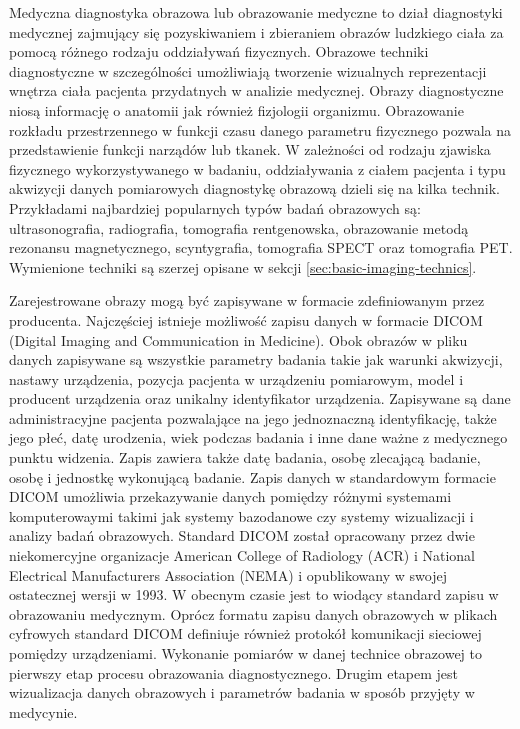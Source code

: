 Medyczna diagnostyka obrazowa lub obrazowanie medyczne to dział diagnostyki medycznej zajmujący się pozyskiwaniem i zbieraniem obrazów ludzkiego ciała za pomocą różnego rodzaju oddziaływań fizycznych.
Obrazowe techniki diagnostyczne w szczególności umożliwiają tworzenie wizualnych reprezentacji wnętrza ciała pacjenta przydatnych w analizie medycznej. Obrazy diagnostyczne niosą informację o anatomii jak również fizjologii organizmu.
Obrazowanie rozkładu przestrzennego w funkcji czasu danego parametru fizycznego pozwala na przedstawienie funkcji narządów lub tkanek.
W zależności od rodzaju zjawiska fizycznego wykorzystywanego w badaniu, oddziaływania z ciałem pacjenta i typu akwizycji danych pomiarowych diagnostykę obrazową dzieli się na kilka technik.
Przykładami najbardziej popularnych typów badań obrazowych są: ultrasonografia, radiografia, tomografia rentgenowska, obrazowanie metodą rezonansu magnetycznego, scyntygrafia, tomografia SPECT oraz tomografia PET.
Wymienione techniki są szerzej opisane w sekcji \ref{sec:basic-imaging-technics}.
\par
Zarejestrowane obrazy mogą być zapisywane w formacie zdefiniowanym przez producenta.
Najczęściej istnieje możliwość zapisu danych w formacie DICOM (Digital Imaging and Communication in Medicine). 
Obok obrazów w pliku danych zapisywane są wszystkie parametry badania takie jak warunki akwizycji, nastawy urządzenia, pozycja pacjenta w urządzeniu pomiarowym, model i producent urządzenia oraz unikalny identyfikator urządzenia.
Zapisywane są dane administracyjne pacjenta pozwalające na jego jednoznaczną identyfikację, także jego płeć, datę urodzenia, wiek podczas badania i inne dane ważne z medycznego punktu widzenia.
Zapis zawiera także datę badania, osobę zlecającą badanie, osobę i jednostkę wykonującą badanie.
Zapis danych w standardowym formacie DICOM umożliwia przekazywanie danych pomiędzy różnymi systemami komputerowaymi takimi jak systemy bazodanowe czy systemy wizualizacji i analizy badań obrazowych.
Standard DICOM został opracowany przez dwie niekomercyjne organizacje American College of Radiology (ACR) i National Electrical Manufacturers Association (NEMA) i opublikowany w swojej ostatecznej wersji w 1993.
W obecnym czasie jest to wiodący standard zapisu w obrazowaniu medycznym.
Oprócz formatu zapisu danych obrazowych w plikach cyfrowych standard DICOM definiuje również protokół komunikacji sieciowej pomiędzy urządzeniami.
Wykonanie pomiarów w danej technice obrazowej to pierwszy etap procesu obrazowania diagnostycznego. Drugim etapem jest wizualizacja danych obrazowych i parametrów badania w sposób przyjęty w medycynie.
